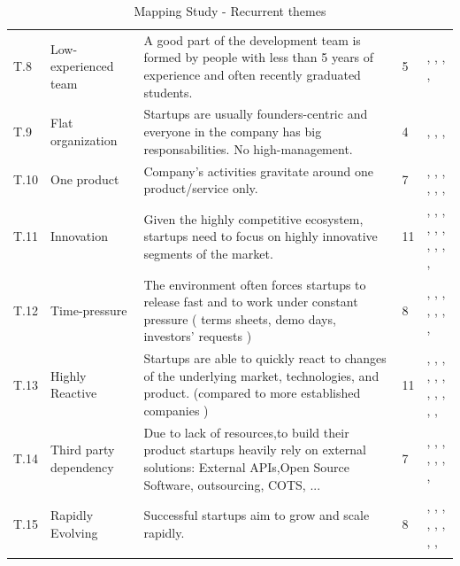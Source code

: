 \documentclass[final,5p,times,twocolumn]{elsarticle}
\begin{document}
\begin{longtable}{|p{0.2in}|p{1in}|p{2.3in}|p{0.47in}|p{0.82in}|}
T.8 & Low-experienced team & A good part of the development team is formed by people with less than 5 years of experience and often recently graduated students. & 5 & \cite{Camel1994a}, \cite{Coleman2008a}, \cite{Coleman2007}, \cite{Ambler2002}, \cite{Kakati2003} \\
T.9 & Flat organization & Startups are usually founders-centric and everyone in the company has big responsabilities. No high-management. & 4 & \cite{Yoffie1999}, \cite{Kajko-Mattsson2008}, \cite{Silva2005}, \cite{Tanabian2005} \\
T.10 & One product & Company's activities gravitate around one product/service only. & 7 & \cite{Ambler2002}, \cite{Kuvinka2011}, \cite{Bean2005}, \cite{Deias}, \cite{Silva2005}, \cite{Coleman2008}, \cite{Taipale2010} \\
T.11 & Innovation & Given the highly competitive ecosystem, startups need to focus on highly innovative segments of the market. & 11 & \cite{Heitlager2007}, \cite{Yogendra2002}, \cite{Mirel2000}, \cite{Steenhuis2008}, \cite{Jansen2008}, \cite{Lai2010}, \cite{Sutton2000}, \cite{Hasel2010}, \cite{Hasel2010}, \cite{Midler2008}, \cite{Kakati2003} \\
T.12 & Time-pressure & The environment often forces startups to  release fast and to work under constant pressure ( terms sheets, demo days, investors' requests ) & 8 & \cite{Zettel2001}, \cite{Camel1994a}, \cite{Coleman2008}, \cite{Tingling2007}, \cite{Sutton2000}, \cite{Deakins2005}, \cite{Hilmola2003}, \cite{Mater2000} \\
T.13 & Highly Reactive & Startups are able to quickly react to changes of the underlying  market, technologies, and product. (compared to more established companies ) & 11 & \cite{Zettel2001}, \cite{Kajko-Mattsson2008}, \cite{Camel1994a}, \cite{Coleman2008a}, \cite{Coleman2008}, \cite{Tingling2007}, \cite{Sutton2000}, \cite{Fayad1997}, \cite{Ambler2002}, \cite{Kuvinka2011}, \cite{Deias}, \cite{Silva2005} \\
T.14 & Third party dependency & Due to lack of resources,to build their product startups heavily rely on external solutions: External APIs,Open Source Software, outsourcing, COTS, ... & 7 & \cite{Yoffie1999}, \cite{Wood2005}, \cite{Wall2001}, \cite{Jansen2008}, \cite{Lai2010}, \cite{Hanna2010}, \cite{Sutton2000}, \cite{Ambler2002} \\
T.15 & Rapidly Evolving & Successful startups aim to grow and scale rapidly. & 8 & \cite{Yogendra2002}, \cite{Yoffie1999}, \cite{Camel1994a}, \cite{Coleman2008}, \cite{Su-Chan2007}, \cite{Sutton2000}, \cite{Ambler2002}, \cite{Kuvinka2011}, \cite{Deakins2005} 
\\

\hline 
 \hline
\caption{Mapping Study - Recurrent themes }\label{tab:ms:themes}\\
\end{longtable}
\small
\twocolumn
\end{document}

